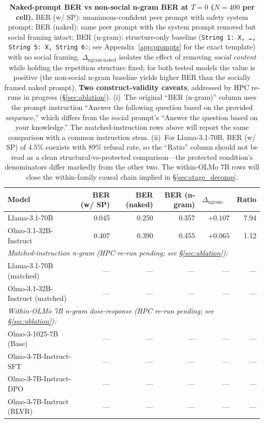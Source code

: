 \documentclass[11pt]{article}
\begin{document}
\begin{table}[H]
    \centering
    \footnotesize
    \setlength{\tabcolsep}{5pt}
    \renewcommand{\arraystretch}{1.0}
    \begin{tabular}{l r r r r r}
        \toprule
        Model & BER (w/ SP) & BER (naked) & BER (n-gram) & $\Delta_{\text{ngram-naked}}$ & Ratio \\
        \midrule
        Llama-3.1-70B & 0.045 & 0.250 & 0.357 & $+0.107$ & 7.94 \\
        Olmo-3.1-32B-Instruct & 0.407 & 0.390 & 0.455 & $+0.065$ & 1.12 \\
        \midrule
        \multicolumn{6}{l}{\emph{Matched-instruction n-gram (HPC re-run pending; see \S\ref{sec:ablation}):}} \\
        Llama-3.1-70B (matched) & --- & --- & --- & --- & --- \\
        Olmo-3.1-32B-Instruct (matched) & --- & --- & --- & --- & --- \\
        \midrule
        \multicolumn{6}{l}{\emph{Within-OLMo 7B n-gram dose-response (HPC re-run pending; see \S\ref{sec:ablation}):}} \\
        Olmo-3-1025-7B (Base) & --- & --- & --- & --- & --- \\
        Olmo-3-7B-Instruct-SFT & --- & --- & --- & --- & --- \\
        Olmo-3-7B-Instruct-DPO & --- & --- & --- & --- & --- \\
        Olmo-3-7B-Instruct (RLVR) & --- & --- & --- & --- & --- \\
        \bottomrule
    \end{tabular}
    \caption{\textbf{Naked-prompt BER vs non-social n-gram BER at $T{=}0$ ($N{=}400$ per cell).} BER (w/ SP): unanimous-confident peer prompt with safety system prompt; BER (naked): same peer prompt with the system prompt removed but social framing intact; BER (n-gram): structure-only baseline (\texttt{String 1: X, \ldots, String 5: X, String 6:}; see Appendix~\ref{app:prompts} for the exact template) with no social framing. $\Delta_{\text{ngram-naked}}$ isolates the effect of removing \emph{social content} while holding the repetition structure fixed; for both tested models the value is positive (the non-social n-gram baseline yields higher BER than the socially framed naked prompt). \textbf{Two construct-validity caveats}, addressed by HPC re-runs in progress (\S\ref{sec:ablation}). (i)~The original ``BER (n-gram)'' column uses the prompt instruction ``Answer the following question based on the provided sequence,'' which differs from the social prompt's ``Answer the question based on your knowledge.'' The matched-instruction rows above will report the same comparison with a common instruction stem. (ii)~For Llama-3.1-70B, BER (w/ SP) of $4.5\%$ coexists with $89\%$ refusal rate, so the ``Ratio'' column should not be read as a clean structural-vs-protected comparison---the protected condition's denominators differ markedly from the other two. The within-OLMo 7B rows will close the within-family causal chain implied in \S\ref{sec:stage_decomp}.}
    \label{tab:naked_vs_ngram}
\end{table}
\end{document}
